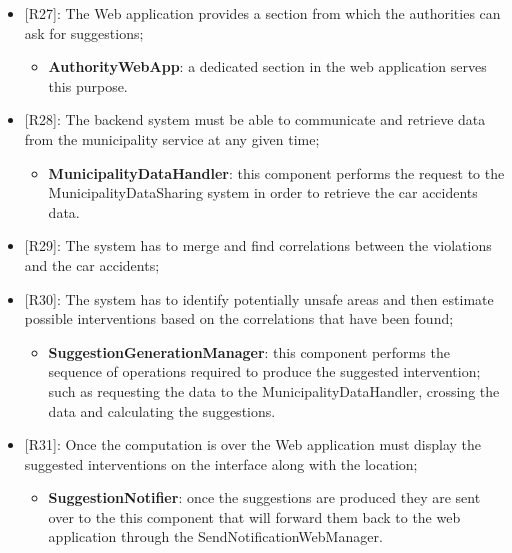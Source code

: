 \begin{itemize}
    \item {[R27]}: The Web application provides a section from which the authorities can ask for suggestions;
    \begin{itemize}
      \item \textbf{AuthorityWebApp}: a dedicated section in the web application serves this purpose.
    \end{itemize}     
    \item {[R28]}: The backend system must be able to communicate and retrieve data from the municipality service at any given time;
    \begin{itemize}
      \item \textbf{MunicipalityDataHandler}: this component performs the request to the MunicipalityDataSharing system in order to retrieve the car accidents data.
    \end{itemize}
    \item {[R29]}: The system has to merge and find correlations between the violations and the car accidents;
    \item[] {[R30]}: The system has to identify potentially unsafe areas and then estimate possible interventions based on the correlations that have been found;
    \begin{itemize}
      \item \textbf{SuggestionGenerationManager}: this component performs the sequence of operations required to produce the suggested intervention; such as requesting the data to the MunicipalityDataHandler, crossing the data and calculating the suggestions.
    \end{itemize}
    \item {[R31]}: Once the computation is over the Web application must display the suggested interventions on the interface along with the location;
    \begin{itemize}
      \item \textbf{SuggestionNotifier}: once the suggestions are produced they are sent over to the this component that will forward them back to the web application through the SendNotificationWebManager.
    \end{itemize}
\end{itemize}
